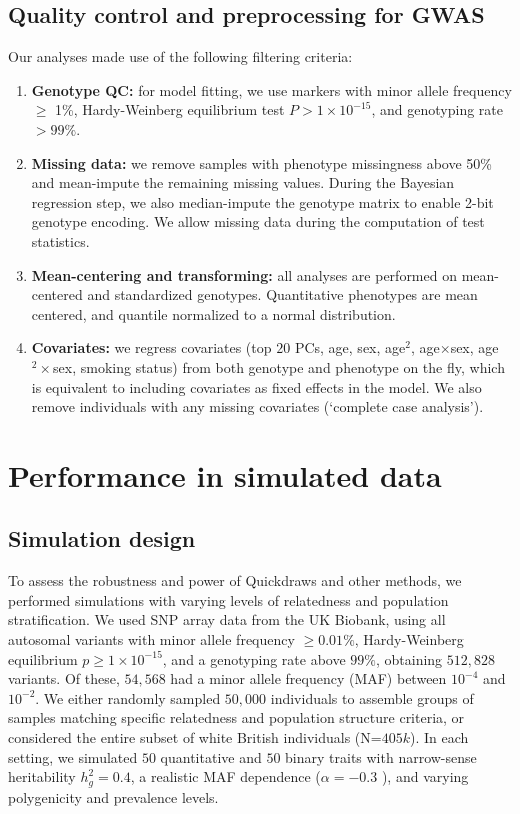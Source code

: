 \subsection{Quality control and preprocessing for GWAS}
Our analyses made use of the following filtering criteria:
\begin{enumerate}
    \item \textbf{Genotype QC:} for model fitting, we use markers with minor allele frequency $\geq$ 1\%, Hardy-Weinberg equilibrium test $P > 1 \times 10^{-15}$, and genotyping rate $> 99\%$. 
    \item \textbf{Missing data:} we remove samples with phenotype missingness above 50\% and mean-impute the remaining missing values.
    During the Bayesian regression step, we also median-impute the genotype matrix to enable 2-bit genotype encoding. We allow missing data during the computation of test statistics.
    \item \textbf{Mean-centering and transforming:} all analyses are performed on mean-centered and standardized genotypes.
    Quantitative phenotypes are mean centered, and quantile normalized to a normal distribution.
    \item \textbf{Covariates:} we regress covariates (top $20$ PCs, age, sex, age$^2$, age$\times$sex, age$^2\times$sex, smoking status) from both genotype and phenotype on the fly, which is equivalent to including covariates as fixed effects in the model.
    We also remove individuals with any missing covariates (`complete case analysis').
\end{enumerate}

\section{Performance in simulated data}
\label{sec:ch5-sim}

\subsection{Simulation design}
\label{sec:ch5-sim-design}
To assess the robustness and power of Quickdraws and other methods, we performed simulations with varying levels of relatedness and population stratification.
%
We used SNP array data from the UK Biobank, using all autosomal variants with minor allele frequency $\geq 0.01\%$, Hardy-Weinberg equilibrium $p \geq 1 \times 10^{-15}$, and a genotyping rate above $99\%$, obtaining $512,828$ variants.
%
Of these, $54{,}568$ had a minor allele frequency (MAF) between $10^{-4}$ and $10^{-2}$.
%
We either randomly sampled $50{,}000$ individuals to assemble groups of samples matching specific relatedness and population structure criteria, or considered the entire subset of white British individuals (N=$405k$).
%
In each setting, we simulated $50$ quantitative and $50$ binary traits with narrow-sense heritability $h_g^2 = 0.4$, a realistic MAF dependence ($\alpha = -0.3$ \cite{zeng2018signatures,schoech2019quantification}), and varying polygenicity and prevalence levels.
%

